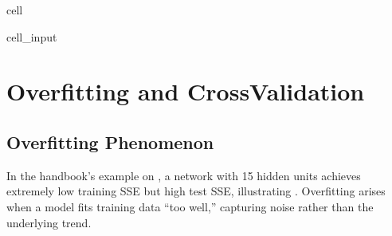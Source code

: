 \documentclass[letterpaper,10pt,english]{jupyterBook}
\begin{document}
\begin{sphinxuseclass}{cell}
\begin{sphinxVerbatimInput}
\begin{sphinxuseclass}{cell_input}
\begin{sphinxVerbatim}[commandchars=\\\{\}]
   
   

  
   


 
       
            
\end{sphinxVerbatim}

\end{sphinxuseclass}\end{sphinxVerbatimInput}

\end{sphinxuseclass}

\section{Overfitting and Cross\sphinxhyphen{}Validation}
\label{\detokenize{04:overfitting-and-cross-validation}}

\subsection{Overfitting Phenomenon}
\label{\detokenize{04:overfitting-phenomenon}}
\sphinxAtStartPar
In the handbook’s example on , a network with 15 hidden units achieves extremely low training SSE but high test SSE, illustrating . Overfitting arises when a model fits training data “too well,” capturing noise rather than the underlying trend.
\end{document}
